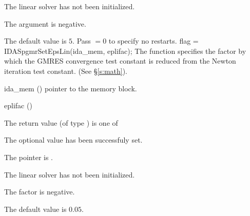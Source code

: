 {{\begin{args}
    The {\idaspgmr} linear solver has not been initialized.
  \item[\Id{IDASPGMR\_ILL\_INPUT}]
    The  argument is negative.
  \end{args}
}
{
  The default value is $5$. Pass  $=0$ to specify no restarts.
}
{
  flag = IDASpgmrSetEpsLin(ida\_mem, eplifac);
}
{
  The function  specifies the factor by
  which the GMRES convergence test constant is reduced
  from the Newton iteration test constant. (See \S\ref{s:math}).
}
{
  \begin{args}
  \item[ida\_mem] ()
    pointer to the {\ida} memory block.
  \item[eplifac] ()

  \end{args}
}
{
  The return value  (of type ) is one of
  \begin{args}
  \item[\Id{IDASPGMR\_SUCCESS}] 
    The optional value has been successfuly set.
  \item[\Id{IDASPGMR\_MEM\_NULL}]
    The  pointer is .
  \item[\Id{IDASPGMR\_LMEM\_NULL}]
    The {\idaspgmr} linear solver has not been initialized.
  \item[\Id{IDASPGMR\_ILL\_INPUT}]
    The factor  is negative.  
  \end{args}
}
{
  The default value is $0.05$.

}}

